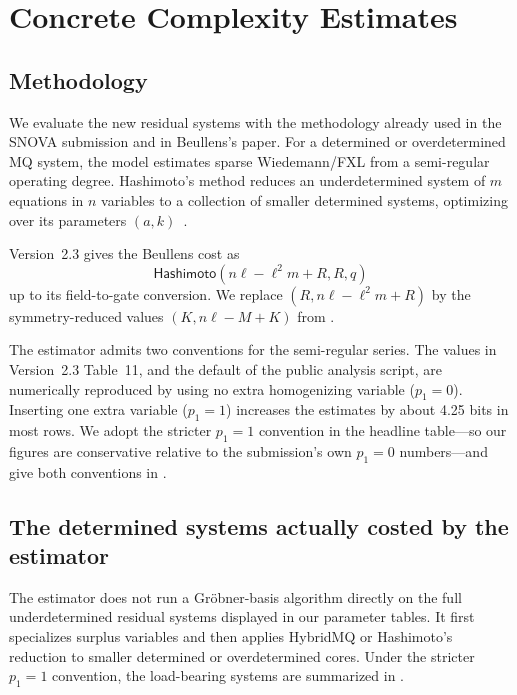 \documentclass[11pt]{article}
\newcommand{\Hashimoto}{\mathsf{Hashimoto}}
\newcommand{\SNOVA}{\textsf{SNOVA}}
\begin{document}
\section{Concrete Complexity Estimates}\label{sec:complexity}

\subsection{Methodology}

We evaluate the new residual systems with the methodology already used in the \SNOVA{} submission and in Beullens's paper.  For a determined or overdetermined MQ system, the model estimates sparse Wiedemann/FXL from a semi-regular operating degree.  Hashimoto's method reduces an underdetermined system of $m$ equations in $n$ variables to a collection of smaller determined systems, optimizing over its parameters $(a,k)$~\cite{Hashimoto2023,Beullens2024SNOVA}.

Version~2.3 gives the Beullens cost as
\[
 \Hashimoto(n\ell-\ell^2m+R,R,q)
\]
up to its field-to-gate conversion.  We replace $(R,n\ell-\ell^2m+R)$ by the symmetry-reduced values $(K,n\ell-M+K)$ from .

The estimator admits two conventions for the semi-regular series.  The values in Version~2.3 Table~11, and the default of the public analysis script, are numerically reproduced by using no extra homogenizing variable ($p_1=0$).  Inserting one extra variable ($p_1=1$) increases the estimates by about 4.25 bits in most rows.  We adopt the stricter $p_1=1$ convention in the headline table---so our figures are conservative relative to the submission's own $p_1=0$ numbers---and give both conventions in .

\subsection{The determined systems actually costed by the estimator}
\label{sec:actual-cores}

The estimator does not run a Gr\"obner-basis algorithm directly on the full
underdetermined residual systems displayed in our parameter tables.  It first
specializes surplus variables and then applies HybridMQ or Hashimoto's
reduction to smaller determined or overdetermined cores.  Under the stricter
$p_1=1$ convention, the load-bearing systems are summarized in
.
\end{document}
